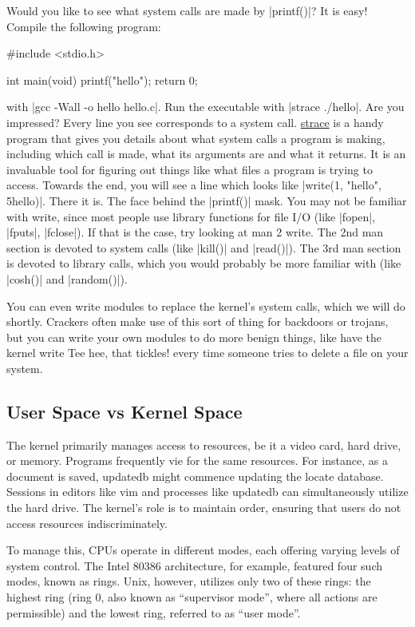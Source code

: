 \documentclass[10pt, oneside]{book}
\begin{document}
Would you like to see what system calls are made by \cpp|printf()|?
It is easy!
Compile the following program:

\begin{code}
#include <stdio.h>

int main(void)
{
    printf("hello");
    return 0;
}
\end{code}

with \sh|gcc -Wall -o hello hello.c|.
Run the executable with \sh|strace ./hello|.
Are you impressed?
Every line you see corresponds to a system call.
\href{https://strace.io/}{strace} is a handy program that gives you details about what system calls a program is making, including which call is made, what its arguments are and what it returns.
It is an invaluable tool for figuring out things like what files a program is trying to access.
Towards the end, you will see a line which looks like \cpp|write(1, "hello", 5hello)|.
There it is.
The face behind the \cpp|printf()| mask.
You may not be familiar with write, since most people use library functions for file I/O (like \cpp|fopen|, \cpp|fputs|, \cpp|fclose|).
If that is the case, try looking at man 2 write.
The 2nd man section is devoted to system calls (like \cpp|kill()| and \cpp|read()|).
The 3rd man section is devoted to library calls, which you would probably be more familiar with (like \cpp|cosh()| and \cpp|random()|).

You can even write modules to replace the kernel's system calls, which we will do shortly.
Crackers often make use of this sort of thing for backdoors or trojans, but you can write your own modules to do more benign things, like have the kernel write Tee hee, that tickles! every time someone tries to delete a file on your system.

\subsection{User Space vs Kernel Space}
\label{sec:user_kernl_space}
The kernel primarily manages access to resources, be it a video card, hard drive, or memory.
Programs frequently vie for the same resources.
For instance, as a document is saved, updatedb might commence updating the locate database.
Sessions in editors like vim and processes like updatedb can simultaneously utilize the hard drive.
The kernel's role is to maintain order, ensuring that users do not access resources indiscriminately.

To manage this, CPUs operate in different modes, each offering varying levels of system control.
The Intel 80386 architecture, for example, featured four such modes, known as rings.
Unix, however, utilizes only two of these rings: the highest ring (ring 0, also known as ``supervisor mode'',
where all actions are permissible) and the lowest ring, referred to as ``user mode''.
\end{document}
